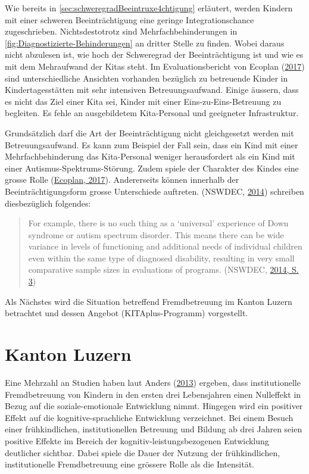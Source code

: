 \documentclass[
  ngerman,
  11pt,
  paper=a4,
  twoside,
  titlepage=true,
  openright,
  abstract=on,
  toc=listofnumbered,
  numbers=noenddot,
  chapterprefix=true,
  headings=optiontohead,
  svgnames,
  dvipsnames]{scrreprt}
\begin{document}
Wie bereits in \cref{sec:schweregradBeeintruxe4chtigung} erläutert,
werden Kindern mit einer schweren Beeinträchtigung eine geringe
Integrationschance zugeschrieben. Nichtsdestotrotz sind
Mehrfachbehinderungen in \cref{fig:Diagnostizierte-Behinderungen} an
dritter Stelle zu finden. Wobei daraus nicht abzulesen ist, wie hoch der
Schweregrad der Beeinträchtigung ist und wie es mit dem Mehraufwand der
Kitas steht. Im Evaluationsbericht von Ecoplan
(\protect\hyperlink{ref-ecoplan}{2017}) sind unterschiedliche Ansichten
vorhanden bezüglich zu betreuende Kinder in Kindertagesstätten mit sehr
intensiven Betreuungsaufwand. Einige äussern, dass es nicht das Ziel
einer Kita sei, Kinder mit einer Eins-zu-Eins-Betreuung zu begleiten. Es
fehle an ausgebildetem Kita-Personal und geeigneter Infrastruktur.

Grundsätzlich darf die Art der Beeinträchtigung nicht gleichgesetzt
werden mit Betreuungsaufwand. Es kann zum Beispiel der Fall sein, dass
ein Kind mit einer Mehrfachbehinderung das Kita-Personal weniger
herausfordert als ein Kind mit einer Autismus-Spektrums-Störung. Zudem
spiele der Charakter des Kindes eine grosse Rolle
(\protect\hyperlink{ref-ecoplan}{Ecoplan, 2017}). Andererseits können
innerhalb der Beeinträchtigungsform grosse Unterschiede auftreten.
(NSWDEC, \protect\hyperlink{ref-centreforeducation2014}{2014}) schreiben
diesbezüglich folgendes:

\begin{quote}
For example, there is no such thing as a ‘universal’ experience of Down
syndrome or autism spectrum disorder. This means there can be wide
variance in levels of functioning and additional needs of individual
children even within the same type of diagnosed disability, resulting in
very small comparative sample sizes in evaluations of programs. (NSWDEC,
\protect\hyperlink{ref-centreforeducation2014}{2014, S. 3})
\end{quote}

Als Nächstes wird die Situation betreffend Fremdbetreuung im Kanton
Luzern betrachtet und dessen Angebot (KITAplus-Programm) vorgestellt.

\hypertarget{sec:kantonluzern}{%
\chapter{Kanton Luzern}\label{sec:kantonluzern}}

Eine Mehrzahl an Studien haben laut Anders
(\protect\hyperlink{ref-anders_2013}{2013}) ergeben, dass
institutionelle Fremdbetreuung von Kindern in den ersten drei
Lebensjahren einen Nulleffekt in Bezug auf die soziale-emotionale
Entwicklung nimmt. Hingegen wird ein positiver Effekt auf die
kognitive-sprachliche Entwicklung verzeichnet. Bei einem Besuch einer
frühkindlichen, institutionellen Betreuung und Bildung ab drei Jahren
seien positive Effekte im Bereich der kognitiv-leistungsbezogenen
Entwicklung deutlicher sichtbar. Dabei spiele die Dauer der Nutzung der
frühkindlichen, institutionelle Fremdbetreuung eine grössere Rolle als
die Intensität.
\end{document}
